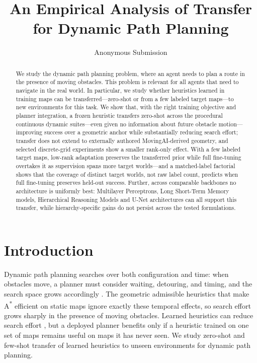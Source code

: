 \documentclass[letterpaper]{article} %
\title{An Empirical Analysis of Transfer for Dynamic Path Planning}
\author{
    Anonymous Submission
}
\begin{document}
\maketitle

\begin{abstract}
We study the dynamic path planning problem, where an agent needs to plan a route in the presence of moving obstacles. This problem is relevant for all agents that need to navigate in the real world. In particular, we study whether heuristics learned in training maps can be transferred---zero-shot or from a few labeled target maps---to new environments for this task. We show that, with the right training objective and planner integration, a frozen heuristic transfers zero-shot across the procedural continuous dynamic suites---even given no information about future obstacle motion---improving success over a geometric anchor while substantially reducing search effort; transfer does not extend to externally authored MovingAI-derived geometry, and selected discrete-grid experiments show a smaller rank-only effect. With a few labeled target maps, low-rank adaptation preserves the transferred prior while full fine-tuning overtakes it as supervision spans more target worlds---and a matched-label factorial shows that the coverage of distinct target worlds, not raw label count, predicts when full fine-tuning preserves held-out success. Further, across comparable backbones no architecture is uniformly best: Multilayer Perceptrons, Long Short-Term Memory models, Hierarchical Reasoning Models and U-Net architectures can all support this transfer, while hierarchy-specific gains do not persist across the tested formulations.
\end{abstract}


\section{Introduction}

Dynamic path planning searches over both configuration and time: when obstacles move, a planner must consider waiting, detouring, and timing, and the search space grows accordingly \citep{silver2005cooperative,phillips2011sipp}. The geometric admissible heuristics that make A\textsuperscript{*} \citep{hart1968astar} efficient on static maps ignore exactly these temporal effects, so search effort grows sharply in the presence of moving obstacles. Learned heuristics can reduce search effort \citep{arfaee2011bootstrap,bhardwaj2017sail,yonetani2021neuralastar}, but a deployed planner benefits only if a heuristic trained on one set of maps remains useful on maps it has never seen. We study zero-shot and few-shot transfer of learned heuristics to unseen environments for dynamic path planning.
\end{document}
